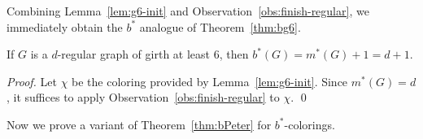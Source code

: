 \documentclass[runningheads, envcountsame]{llncs}
\begin{document}
Combining Lemma~\ref{lem:g6-init} and Observation~\ref{obs:finish-regular}, we immediately obtain the $b^*$ analogue of Theorem~\ref{thm:bg6}.

\begin{proposition}\label{prop:bsrg6}
If $G$ is a $d$-regular graph of girth at least 6, then $b^*(G) = m^*(G) +1 = d + 1$.
\end{proposition}
\begin{proof}
Let $\chi$ be the coloring provided by Lemma~\ref{lem:g6-init}.
Since $m^*(G) = d$, it suffices to apply Observation~\ref{obs:finish-regular} to $\chi$.
\qed\end{proof}

\setcounter{savedtheorem}{\value{theorem}}
\setcounter{theorem}{3}

Now we prove a variant of Theorem~\ref{thm:bPeter} for $b^*$-colorings.

\begin{theorem}
\thmPG
\end{theorem}

\setcounter{theorem}{\value{savedtheorem}}
\end{document}
